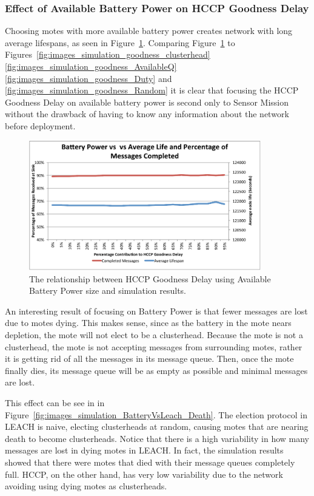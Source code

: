 \subsubsection{Effect of Available Battery Power on HCCP Goodness Delay}


Choosing motes with more available battery power creates network with long average lifespans, as seen in 
Figure~\ref{fig:images_simulation_goodness_Battery2}. Comparing Figure~\ref{fig:images_simulation_goodness_Battery2} to 
Figures~\ref{fig:images_simulation_goodness_clusterhead} \ref{fig:images_simulation_goodness_AvailableQ} \ref{fig:images_simulation_goodness_Duty}
and \ref{fig:images_simulation_goodness_Random} it is clear that focusing the HCCP Goodness Delay on available battery 
power is second only to Sensor Mission without the drawback of having to know any information about the
network before deployment. 

\begin{figure}[htbp]
	\centering
		\includegraphics[width=0.9\textwidth]{images/simulation/goodness/Battery4.pdf}
	\caption{The relationship between HCCP Goodness Delay using Available Battery Power size and simulation results.}
	\label{fig:images_simulation_goodness_Battery2}
\end{figure}


An interesting result of focusing on Battery Power is that fewer messages are lost
due to motes dying. This makes sense, since as the battery in the mote nears depletion, 
the mote will not elect to be a clusterhead. Because the mote is not a clusterhead, the 
mote is not accepting messages from surrounding motes, rather it is getting rid of 
all the messages in its message queue. Then, once the mote finally dies, its 
message queue will be as empty as possible and minimal messages are lost.  

This
effect can be see in in Figure~\ref{fig:images_simulation_BatteryVsLeach_Death}.
The election protocol in LEACH is naive, electing clusterheads at random, causing
motes that are nearing death to become clusterheads. Notice that there is a 
high variability in how many messages are lost in dying motes in LEACH. 
In fact, the simulation results showed that there were motes that
died with their message queues completely full. HCCP, on the other hand,
has very low variability due to the network avoiding using dying motes as clusterheads.

